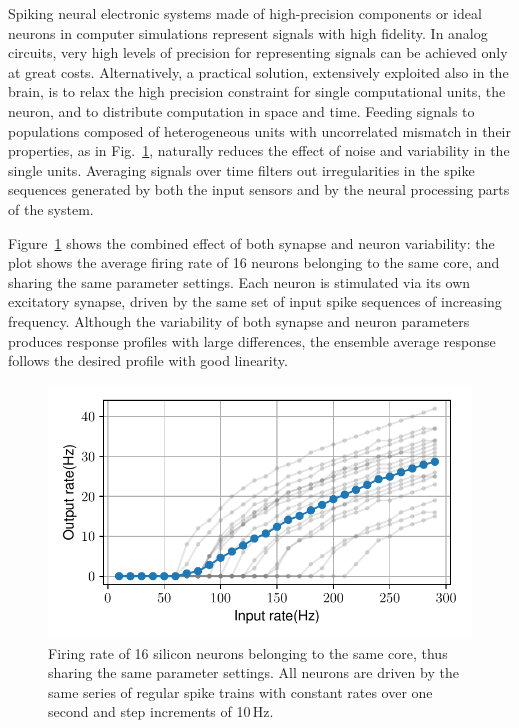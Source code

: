 Spiking neural electronic systems made of high-precision components or ideal neurons in computer simulations represent signals with high fidelity.
In analog circuits, very high levels of precision for representing signals can be achieved only at great costs.
Alternatively, a practical solution, extensively exploited also in the brain, is to relax the high precision constraint for single computational units, the neuron, and to distribute computation in space and time.
Feeding signals to populations composed of heterogeneous units with uncorrelated mismatch in their properties, as in Fig.~\ref{fig:ff_curves}, naturally reduces the effect of noise and variability in the single units.
Averaging signals over time filters out irregularities in the spike sequences generated by both the input sensors and by the neural processing parts of the system.

Figure~\ref{fig:ff_curves} shows the combined effect of both synapse and neuron variability: the plot shows the average firing rate of 16 neurons belonging to the same core, and sharing the same parameter settings.
Each neuron is stimulated via its own excitatory synapse, driven by the same set of input spike sequences of increasing frequency. Although the variability of both synapse and neuron parameters produces response profiles with large differences, the ensemble average response follows the desired profile with good linearity.

\begin{figure}[h!]
\centering
    \includegraphics[width=.7\textwidth]{img/chapter4/ff_curves_all.pdf}
  \caption[Variability in transfer functions of 16 silicon neurons.]{Firing rate of 16 silicon neurons belonging to the same core, thus sharing the same parameter settings. All neurons are driven by the same series of regular spike trains with constant rates over one second and step increments of 10\,Hz.}
\label{fig:ff_curves}
\end{figure}

